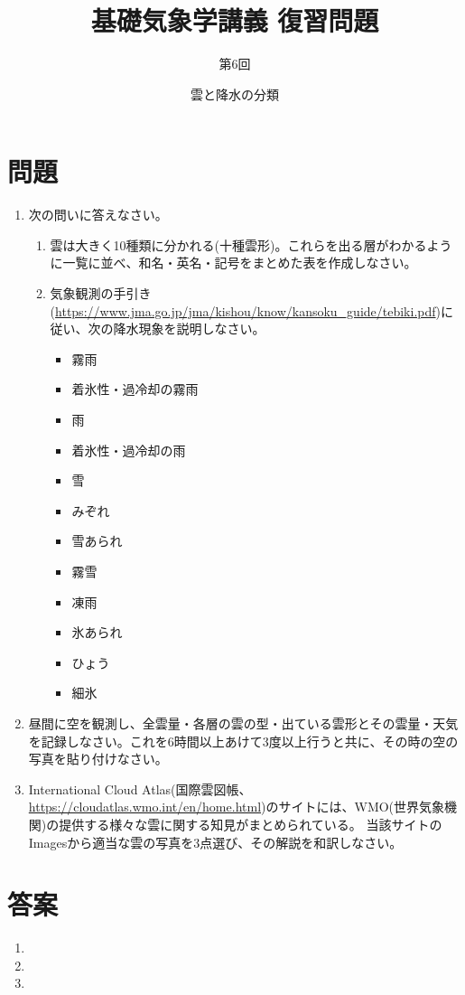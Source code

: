 \documentclass{jsarticle}
\newenvironment{problems}
{
  \renewcommand\labelenumi{\doublebox{\arabic{enumi}}}
  \begin{enumerate}
}{
  \end{enumerate}
  \renewcommand\labelenumi{\arabic{enumi}.}
}
\begin{document}
\title{基礎気象学講義 復習問題} %
\author{第6回} %
\date{雲と降水の分類} %
\maketitle

\section{問題}

    \begin{problems}
    \item 次の問いに答えなさい。
        \begin{enumerate}[(1)]
        \item 雲は大きく10種類に分かれる(十種雲形)。これらを出る層がわかるように一覧に並べ、和名・英名・記号をまとめた表を作成しなさい。
        \item 気象観測の手引き(\url{https://www.jma.go.jp/jma/kishou/know/kansoku_guide/tebiki.pdf})に従い、次の降水現象を説明しなさい。
        \begin{itemize}
            \item 霧雨
            \item 着氷性・過冷却の霧雨
            \item 雨
            \item 着氷性・過冷却の雨
            \item 雪
            \item みぞれ
            \item 雪あられ
            \item 霧雪
            \item 凍雨
            \item 氷あられ
            \item ひょう
            \item 細氷\\
        \end{itemize}
        \end{enumerate}

    \item 昼間に空を観測し、全雲量・各層の雲の型・出ている雲形とその雲量・天気を記録しなさい。これを6時間以上あけて3度以上行うと共に、その時の空の写真を貼り付けなさい。\\

    \item International Cloud Atlas(国際雲図帳、\url{https://cloudatlas.wmo.int/en/home.html})のサイトには、WMO(世界気象機関)の提供する様々な雲に関する知見がまとめられている。
        当該サイトのImagesから適当な雲の写真を3点選び、その解説を和訳しなさい。

\end{problems}

\section{答案}
\begin{problems}
\item 

\item 

\item 

\end{problems}
\end{document}
